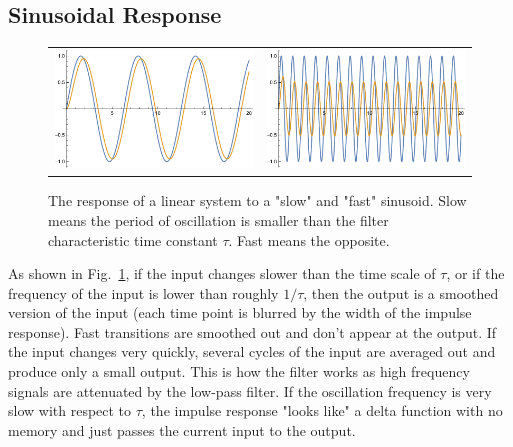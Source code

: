 \subsection{Sinusoidal Response}
\begin{figure}[tb]
\centering
\begin{tabular}{cc}
\includegraphics[width=.45\columnwidth]{slow_sine.pdf} &
\includegraphics[width=.45\columnwidth]{fast_sine.pdf} \\
\end{tabular}
\caption{The response of a linear system to a "slow" and "fast" sinusoid.  Slow means the period of oscillation is smaller than the filter characteristic time constant $\tau$.  Fast means the opposite.}
\label{fig:fast_slow_resp}
\end{figure}
As shown in Fig.~\ref{fig:fast_slow_resp}, if the input changes slower than the time scale of $\tau$, or if the frequency of the input is lower than roughly $1/\tau$, then the output is a smoothed version of the input (each time point is blurred by the width of the impulse response).  Fast transitions are smoothed out and don't appear at the output.   If the input changes very quickly, several cycles of the input are averaged out and produce only a small output.  This is how the filter works as high frequency signals are attenuated by the low-pass filter.  If the oscillation frequency is very slow with respect to $\tau$, the impulse response "looks like" a delta function with no memory and just passes the current input to the output.
